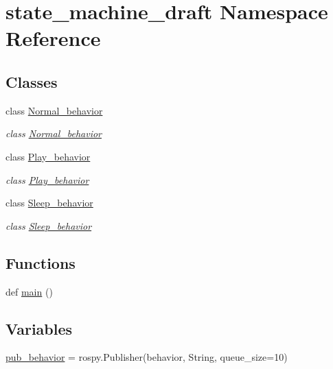 \hypertarget{namespacestate__machine__draft}{}\section{state\+\_\+machine\+\_\+draft Namespace Reference}
\label{namespacestate__machine__draft}
\subsection*{Classes}
\begin{DoxyCompactItemize}
\item 
class \hyperlink{classstate__machine__draft_1_1Normal__behavior}{Normal\+\_\+behavior}
\begin{DoxyCompactList}\small\item\em class \hyperlink{classstate__machine__draft_1_1Normal__behavior}{Normal\+\_\+behavior} \end{DoxyCompactList}\item 
class \hyperlink{classstate__machine__draft_1_1Play__behavior}{Play\+\_\+behavior}
\begin{DoxyCompactList}\small\item\em class \hyperlink{classstate__machine__draft_1_1Play__behavior}{Play\+\_\+behavior} \end{DoxyCompactList}\item 
class \hyperlink{classstate__machine__draft_1_1Sleep__behavior}{Sleep\+\_\+behavior}
\begin{DoxyCompactList}\small\item\em class \hyperlink{classstate__machine__draft_1_1Sleep__behavior}{Sleep\+\_\+behavior} \end{DoxyCompactList}\end{DoxyCompactItemize}
\subsection*{Functions}
\begin{DoxyCompactItemize}
\item 
def \hyperlink{namespacestate__machine__draft_a609bd57b9ba6a918b0f3a66a5e69d549}{main} ()
\end{DoxyCompactItemize}
\subsection*{Variables}
\begin{DoxyCompactItemize}
\item 
\hyperlink{namespacestate__machine__draft_a5d89f19fee673284dd580d33659587ec}{pub\+\_\+behavior} = rospy.\+Publisher(\textquotesingle{}behavior\textquotesingle{}, String, queue\+\_\+size=10)
\end{DoxyCompactItemize}



